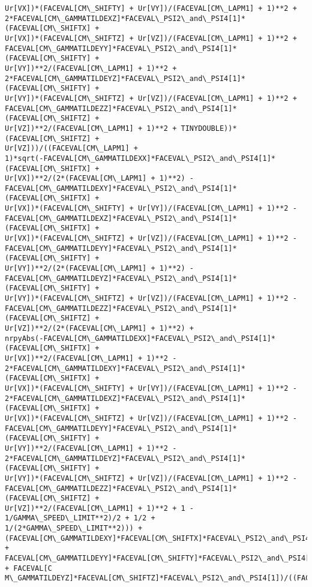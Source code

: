 \documentclass[landscape,letterpaper,10pt,english]{article}
\begin{document}
\begin{Verbatim}[commandchars=\\\{\}]
Ur[VX])*(FACEVAL[CM\_SHIFTY] + Ur[VY])/(FACEVAL[CM\_LAPM1] + 1)**2 +
2*FACEVAL[CM\_GAMMATILDEXZ]*FACEVAL\_PSI2\_and\_PSI4[1]*(FACEVAL[CM\_SHIFTX] +
Ur[VX])*(FACEVAL[CM\_SHIFTZ] + Ur[VZ])/(FACEVAL[CM\_LAPM1] + 1)**2 +
FACEVAL[CM\_GAMMATILDEYY]*FACEVAL\_PSI2\_and\_PSI4[1]*(FACEVAL[CM\_SHIFTY] +
Ur[VY])**2/(FACEVAL[CM\_LAPM1] + 1)**2 +
2*FACEVAL[CM\_GAMMATILDEYZ]*FACEVAL\_PSI2\_and\_PSI4[1]*(FACEVAL[CM\_SHIFTY] +
Ur[VY])*(FACEVAL[CM\_SHIFTZ] + Ur[VZ])/(FACEVAL[CM\_LAPM1] + 1)**2 +
FACEVAL[CM\_GAMMATILDEZZ]*FACEVAL\_PSI2\_and\_PSI4[1]*(FACEVAL[CM\_SHIFTZ] +
Ur[VZ])**2/(FACEVAL[CM\_LAPM1] + 1)**2 + TINYDOUBLE))*(FACEVAL[CM\_SHIFTZ] +
Ur[VZ]))/((FACEVAL[CM\_LAPM1] +
1)*sqrt(-FACEVAL[CM\_GAMMATILDEXX]*FACEVAL\_PSI2\_and\_PSI4[1]*(FACEVAL[CM\_SHIFTX] +
Ur[VX])**2/(2*(FACEVAL[CM\_LAPM1] + 1)**2) -
FACEVAL[CM\_GAMMATILDEXY]*FACEVAL\_PSI2\_and\_PSI4[1]*(FACEVAL[CM\_SHIFTX] +
Ur[VX])*(FACEVAL[CM\_SHIFTY] + Ur[VY])/(FACEVAL[CM\_LAPM1] + 1)**2 -
FACEVAL[CM\_GAMMATILDEXZ]*FACEVAL\_PSI2\_and\_PSI4[1]*(FACEVAL[CM\_SHIFTX] +
Ur[VX])*(FACEVAL[CM\_SHIFTZ] + Ur[VZ])/(FACEVAL[CM\_LAPM1] + 1)**2 -
FACEVAL[CM\_GAMMATILDEYY]*FACEVAL\_PSI2\_and\_PSI4[1]*(FACEVAL[CM\_SHIFTY] +
Ur[VY])**2/(2*(FACEVAL[CM\_LAPM1] + 1)**2) -
FACEVAL[CM\_GAMMATILDEYZ]*FACEVAL\_PSI2\_and\_PSI4[1]*(FACEVAL[CM\_SHIFTY] +
Ur[VY])*(FACEVAL[CM\_SHIFTZ] + Ur[VZ])/(FACEVAL[CM\_LAPM1] + 1)**2 -
FACEVAL[CM\_GAMMATILDEZZ]*FACEVAL\_PSI2\_and\_PSI4[1]*(FACEVAL[CM\_SHIFTZ] +
Ur[VZ])**2/(2*(FACEVAL[CM\_LAPM1] + 1)**2) +
nrpyAbs(-FACEVAL[CM\_GAMMATILDEXX]*FACEVAL\_PSI2\_and\_PSI4[1]*(FACEVAL[CM\_SHIFTX] +
Ur[VX])**2/(FACEVAL[CM\_LAPM1] + 1)**2 -
2*FACEVAL[CM\_GAMMATILDEXY]*FACEVAL\_PSI2\_and\_PSI4[1]*(FACEVAL[CM\_SHIFTX] +
Ur[VX])*(FACEVAL[CM\_SHIFTY] + Ur[VY])/(FACEVAL[CM\_LAPM1] + 1)**2 -
2*FACEVAL[CM\_GAMMATILDEXZ]*FACEVAL\_PSI2\_and\_PSI4[1]*(FACEVAL[CM\_SHIFTX] +
Ur[VX])*(FACEVAL[CM\_SHIFTZ] + Ur[VZ])/(FACEVAL[CM\_LAPM1] + 1)**2 -
FACEVAL[CM\_GAMMATILDEYY]*FACEVAL\_PSI2\_and\_PSI4[1]*(FACEVAL[CM\_SHIFTY] +
Ur[VY])**2/(FACEVAL[CM\_LAPM1] + 1)**2 -
2*FACEVAL[CM\_GAMMATILDEYZ]*FACEVAL\_PSI2\_and\_PSI4[1]*(FACEVAL[CM\_SHIFTY] +
Ur[VY])*(FACEVAL[CM\_SHIFTZ] + Ur[VZ])/(FACEVAL[CM\_LAPM1] + 1)**2 -
FACEVAL[CM\_GAMMATILDEZZ]*FACEVAL\_PSI2\_and\_PSI4[1]*(FACEVAL[CM\_SHIFTZ] +
Ur[VZ])**2/(FACEVAL[CM\_LAPM1] + 1)**2 + 1 - 1/GAMMA\_SPEED\_LIMIT**2)/2 + 1/2 +
1/(2*GAMMA\_SPEED\_LIMIT**2))) +
(FACEVAL[CM\_GAMMATILDEXY]*FACEVAL[CM\_SHIFTX]*FACEVAL\_PSI2\_and\_PSI4[1] +
FACEVAL[CM\_GAMMATILDEYY]*FACEVAL[CM\_SHIFTY]*FACEVAL\_PSI2\_and\_PSI4[1] + FACEVAL[C
M\_GAMMATILDEYZ]*FACEVAL[CM\_SHIFTZ]*FACEVAL\_PSI2\_and\_PSI4[1])/((FACEVAL[CM\_LAPM1]

\end{Verbatim}
\end{document}
